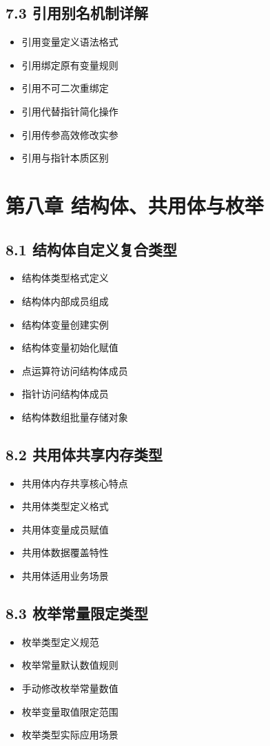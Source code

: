 \subsection{7.3 引用别名机制详解}
\begin{itemize}
\item 引用变量定义语法格式
\item 引用绑定原有变量规则
\item 引用不可二次重绑定
\item 引用代替指针简化操作
\item 引用传参高效修改实参
\item 引用与指针本质区别
\end{itemize}

\section{第八章 结构体、共用体与枚举}
\subsection{8.1 结构体自定义复合类型}
\begin{itemize}
\item 结构体类型格式定义
\item 结构体内部成员组成
\item 结构体变量创建实例
\item 结构体变量初始化赋值
\item 点运算符访问结构体成员
\item 指针访问结构体成员
\item 结构体数组批量存储对象
\end{itemize}

\subsection{8.2 共用体共享内存类型}
\begin{itemize}
\item 共用体内存共享核心特点
\item 共用体类型定义格式
\item 共用体变量成员赋值
\item 共用体数据覆盖特性
\item 共用体适用业务场景
\end{itemize}

\subsection{8.3 枚举常量限定类型}
\begin{itemize}
\item 枚举类型定义规范
\item 枚举常量默认数值规则
\item 手动修改枚举常量数值
\item 枚举变量取值限定范围
\item 枚举类型实际应用场景
\end{itemize}

